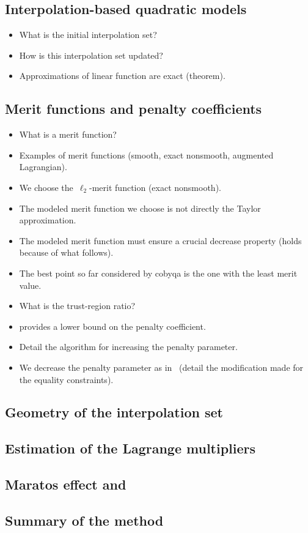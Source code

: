 \subsection{Interpolation-based quadratic models}
\label{subsec:cobyqa-models}

\begin{itemize}
    \item What is the initial interpolation set?
    \item How is this interpolation set updated?
    \item Approximations of linear function are exact (theorem).
\end{itemize}

\subsection{Merit functions and penalty coefficients}
\label{subsec:cobyqa-merit-function}

\begin{itemize}
    \item What is a merit function?
    \item Examples of merit functions (smooth, exact nonsmooth, augmented Lagrangian).
    \item We choose the~$\ell_2$-merit function (exact nonsmooth).
    \item The modeled merit function we choose is not directly the Taylor approximation.
    \item The modeled merit function must ensure a crucial decrease property (holds because of what follows).
    \item The best point so far considered by \gls{cobyqa} is the one with the least merit value.
    \item What is the trust-region ratio?
    \item \Cite[thm.~14.5.1]{Conn_Gould_Toint_2000} provides a lower bound on the penalty coefficient.
    \item Detail the algorithm for increasing the penalty parameter.
    \item We decrease the penalty parameter as in~\cite{Powell_1994} (detail the modification made for the equality constraints).
\end{itemize}

\subsection{Geometry of the interpolation set}

\subsection{Estimation of the Lagrange multipliers}

\subsection{Maratos effect and }

\subsection{Summary of the method}
